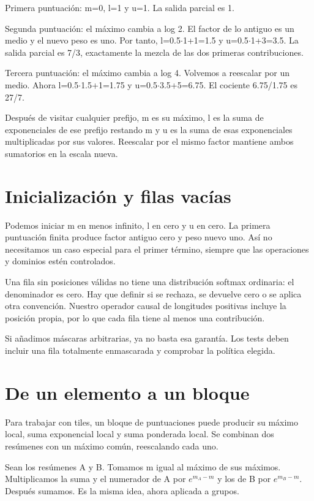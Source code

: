 \documentclass[12pt,a4paper,oneside]{report}
\begin{document}
Primera puntuación: m=0, l=1 y u=1. La salida parcial es 1.

Segunda puntuación: el máximo cambia a log 2. El factor de lo antiguo es un medio y el nuevo peso es uno. Por tanto, l=0.5\ensuremath{\cdot}1+1=1.5 y u=0.5\ensuremath{\cdot}1+3=3.5. La salida parcial es 7/3, exactamente la mezcla de las dos primeras contribuciones.

Tercera puntuación: el máximo cambia a log 4. Volvemos a reescalar por un medio. Ahora l=0.5\ensuremath{\cdot}1.5+1=1.75 y u=0.5\ensuremath{\cdot}3.5+5=6.75. El cociente 6.75/1.75 es 27/7.

\begin{comprueba}
Después de visitar cualquier prefijo, m es su máximo, l es la suma de exponenciales de ese prefijo restando m y u es la suma de esas exponenciales multiplicadas por sus valores. Reescalar por el mismo factor mantiene ambos sumatorios en la escala nueva.

\end{comprueba}
\section{Inicialización y filas vacías}
Podemos iniciar m en menos infinito, l en cero y u en cero. La primera puntuación finita produce factor antiguo cero y peso nuevo uno. Así no necesitamos un caso especial para el primer término, siempre que las operaciones y dominios estén controlados.

Una fila sin posiciones válidas no tiene una distribución softmax ordinaria: el denominador es cero. Hay que definir si se rechaza, se devuelve cero o se aplica otra convención. Nuestro operador causal de longitudes positivas incluye la posición propia, por lo que cada fila tiene al menos una contribución.

Si añadimos máscaras arbitrarias, ya no basta esa garantía. Los tests deben incluir una fila totalmente enmascarada y comprobar la política elegida.

\section{De un elemento a un bloque}
Para trabajar con tiles, un bloque de puntuaciones puede producir su máximo local, suma exponencial local y suma ponderada local. Se combinan dos resúmenes con un máximo común, reescalando cada uno.

Sean los resúmenes A y B. Tomamos m igual al máximo de sus máximos. Multiplicamos la suma y el numerador de A por $e^{m_A-m}$ y los de B por $e^{m_B-m}$. Después sumamos. Es la misma idea, ahora aplicada a grupos.
\end{document}
